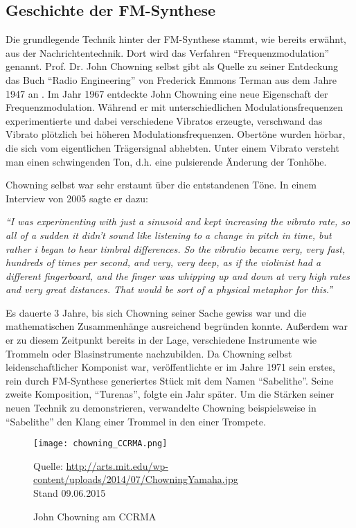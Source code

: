 \subsection{Geschichte der FM-Synthese}
\label{geschichteFMSynthese}
Die grundlegende Technik hinter der FM-Synthese stammt, wie bereits erwähnt, aus der Nachrichtentechnik. Dort wird das Verfahren ``Frequenzmodulation'' genannt. Prof. Dr. John Chowning selbst gibt als Quelle zu seiner Entdeckung das Buch ``Radio Engineering'' von Frederick Emmons Terman aus dem Jahre 1947 an \cite[S. 35]{soundofinnovation}. Im Jahr 1967 entdeckte John Chowning eine neue Eigenschaft der Frequenzmodulation. Während er mit unterschiedlichen Modulationsfrequenzen experimentierte und dabei verschiedene Vibratos erzeugte, verschwand das Vibrato plötzlich bei höheren Modulationsfrequenzen. Obertöne wurden hörbar, die sich vom eigentlichen Trägersignal abhebten. Unter einem Vibrato versteht man einen schwingenden Ton, d.h. eine pulsierende Änderung der Tonhöhe.\cite{fatherofdigitalmusik}

Chowning selbst war sehr erstaunt über die entstandenen Töne. In einem Interview von 2005 sagte er dazu: 

\textit{``I was experimenting with just a sinusoid and kept increasing the vibrato rate, so all of a sudden it didn't sound like listening to a change in pitch in time, but rather i began to hear timbral differences. So the vibratio became very, very fast, hundreds of times per second, and very, very deep, as if the violinist had a different fingerboard, and the finger was whipping up and down at very high rates and very great distances. That would be sort of a physical metaphor for this.''}\cite[S. 34f.]{soundofinnovation}

Es dauerte 3 Jahre, bis sich Chowning seiner Sache gewiss war und die mathematischen Zusammenhänge ausreichend begründen konnte. Außerdem war er zu diesem Zeitpunkt bereits in der Lage, verschiedene Instrumente wie Trommeln oder Blasinstrumente nachzubilden. Da Chowning selbst leidenschaftlicher Komponist war, veröffentlichte er im Jahre 1971 sein erstes, rein durch FM-Synthese generiertes Stück mit dem Namen ``Sabelithe''. Seine zweite Komposition, ``Turenas'', folgte ein Jahr später.
Um die Stärken seiner neuen Technik zu demonstrieren, verwandelte Chowning beispielsweise in ``Sabelithe'' den Klang einer Trommel in den einer Trompete.\cite[S. 39]{soundofinnovation}
 
\begin{figure} [ht]
\centering
  \texttt{[image: chowning\_CCRMA.png]}
\caption{John Chowning am CCRMA}
\label{fig:chowningdx7}
Quelle: \url{ http://arts.mit.edu/wp-content/uploads/2014/07/ChowningYamaha.jpg} \\Stand 09.06.2015
\end{figure}
 
